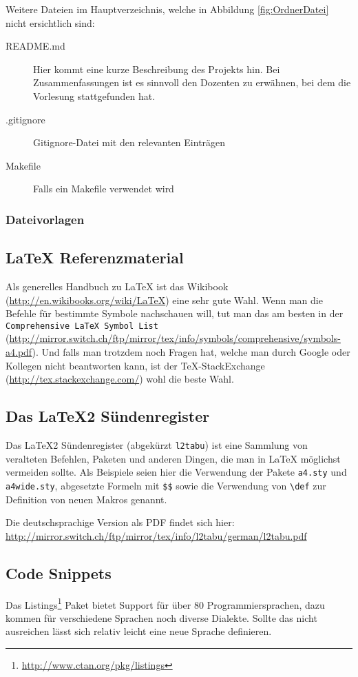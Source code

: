 Weitere Dateien im Hauptverzeichnis, welche in Abbildung \ref{fig:OrdnerDatei} nicht ersichtlich sind:
\begin{description}
  \item[README.md] Hier kommt eine kurze Beschreibung des Projekts hin. Bei Zusammenfassungen ist es sinnvoll den Dozenten zu erwähnen,
  	bei dem die Vorlesung stattgefunden hat.
  \item[.gitignore] Gitignore-Datei mit den relevanten Einträgen
  \item[Makefile]	Falls ein Makefile verwendet wird
\end{description}

\subsubsection{Dateivorlagen}


\subsection{\LaTeX{} Referenzmaterial}

Als generelles Handbuch zu \LaTeX{} ist das  Wikibook (\url{http://en.wikibooks.org/wiki/LaTeX})
eine sehr gute Wahl. Wenn man die Befehle für bestimmte Symbole nachschauen will, tut man das am
besten in der \texttt{Comprehensive \LaTeX{} Symbol List}
(\url{http://mirror.switch.ch/ftp/mirror/tex/info/symbols/comprehensive/symbols-a4.pdf}). Und falls
man trotzdem noch Fragen hat, welche man durch Google oder Kollegen nicht beantworten kann, ist der
\TeX-StackExchange (\url{http://tex.stackexchange.com/}) wohl die beste Wahl.

\subsection{Das \LaTeX2 Sündenregister}

Das \LaTeX2 Sündenregister (abgekürzt \texttt{l2tabu}) ist eine Sammlung von veralteten Befehlen,
Paketen und anderen Dingen, die man in \LaTeX{} möglichst vermeiden sollte. Als Beispiele seien hier
die Verwendung der Pakete \texttt{a4.sty} und \texttt{a4wide.sty}, abgesetzte Formeln mit
\texttt{\$\$} sowie die Verwendung von \texttt{\textbackslash def} zur Definition von neuen Makros genannt.

Die deutschsprachige Version als PDF findet sich hier:
\url{http://mirror.switch.ch/ftp/mirror/tex/info/l2tabu/german/l2tabu.pdf}

\subsection{Code Snippets}
Das Listings\footnote{\url{http://www.ctan.org/pkg/listings}} Paket bietet Support für über 80 Programmiersprachen, dazu kommen für verschiedene Sprachen noch diverse Dialekte. Sollte das nicht
ausreichen lässt sich relativ leicht eine neue Sprache definieren.

